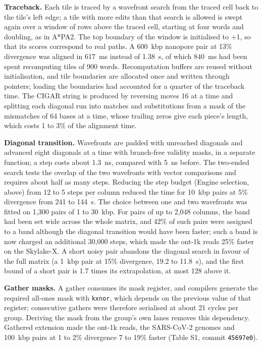 \documentclass[10pt]{article}
\begin{document}
\textbf{Traceback.} Each tile is traced by a wavefront search from the traced cell back to the tile's left edge; a tile with more edits than that search is allowed is swept again over a window of rows above the traced cell, starting at four words and doubling, as in A*PA2. The top boundary of the window is initialised to +1, so that its scores correspond to real paths. A 600~kbp nanopore pair at 13\% divergence was aligned in 617~ms instead of 1.38~s, of which 840~ms had been spent recomputing tiles of 900 words. Recomputation buffers are reused without initialisation, and tile boundaries are allocated once and written through pointers; loading the boundaries had accounted for a quarter of the traceback time. The CIGAR string is produced by reversing moves 16 at a time and splitting each diagonal run into matches and substitutions from a mask of the mismatches of 64 bases at a time, whose trailing zeros give each piece's length, which costs 1 to 3\% of the alignment time.

\textbf{Diagonal transition.} Wavefronts are padded with unreached diagonals and advanced eight diagonals at a time with branch-free validity masks, in a separate function; a step costs about 1.3~ns, compared with 5~ns before. The two-ended search tests the overlap of the two wavefronts with vector comparisons and requires about half as many steps. Reducing the step budget (Engine selection, above) from 12 to 5 steps per column reduced the time for 10~kbp pairs at 5\% divergence from 241 to 144~\textmu s. The choice between one and two wavefronts was fitted on 1{,}300 pairs of 1 to 30~kbp. For pairs of up to 2{,}048 columns, the band had been set wide across the whole matrix, and 42\% of such pairs were assigned to a band although the diagonal transition would have been faster; such a band is now charged an additional 30{,}000 steps, which made the ont-1k reads 25\% faster on the Skylake-X. A short noisy pair abandons the diagonal search in favour of the full matrix (a 1~kbp pair at 15\% divergence, 19.2 to 11.8~\textmu s), and the first bound of a short pair is 1.7 times its extrapolation, at most 128 above it.

\textbf{Gather masks.} A gather consumes its mask register, and compilers generate the required all-ones mask with \texttt{kxnor}, which depends on the previous value of that register; consecutive gathers were therefore serialised at about 21 cycles per group. Deriving the mask from the group's own lanes removes this dependency. Gathered extension made the ont-1k reads, the SARS-CoV-2 genomes and 100~kbp pairs at 1 to 2\% divergence 7 to 19\% faster (Table S1, commit \texttt{45697e0}).
\end{document}
